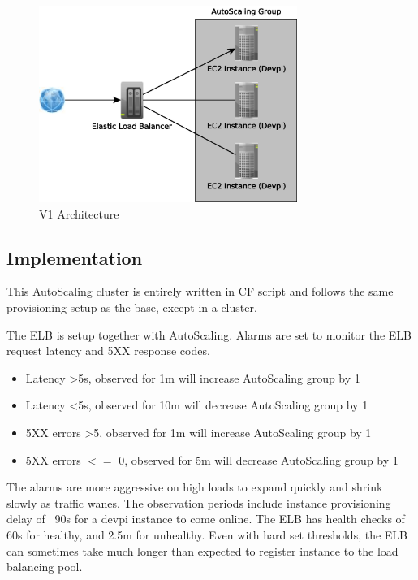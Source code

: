 \documentclass[12pt, letterpaper]{article}
\begin{document}
\begin{figure}[H]
    \caption{V1 Architecture}
    \centering
    \includegraphics[width=0.75\textwidth]{figures/v1_arch.eps}
\end{figure}

\subsection{Implementation}
This AutoScaling cluster is entirely written in CF script and follows the same provisioning setup as the base, except in a cluster.

The ELB is setup together with AutoScaling. Alarms are set to monitor the ELB request latency and 5XX response codes.

\begin{itemize}
    \item Latency \textgreater 5s, observed for 1m will increase AutoScaling group by 1
    \item Latency \textless 5s, observed for 10m will decrease AutoScaling group by 1
    \item 5XX errors \textgreater 5, observed for 1m will increase AutoScaling group by 1
    \item 5XX errors $<=$ 0, observed for 5m will decrease AutoScaling group by 1
\end{itemize}

The alarms are more aggressive on high loads to expand quickly and shrink slowly as traffic wanes. The observation periods
include instance provisioning delay of ~90s for a devpi instance to come online. The ELB has health checks of 60s for healthy, and
2.5m for unhealthy. Even with hard set thresholds, the ELB can sometimes take much longer than expected to register instance 
to the load balancing pool.
\end{document}

